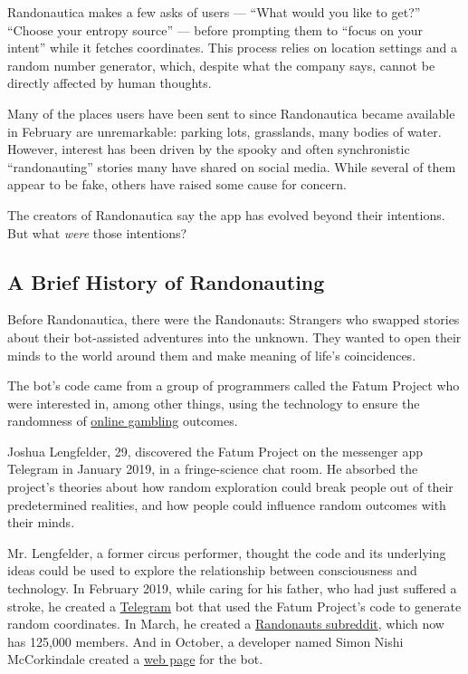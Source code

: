 Randonautica makes a few asks of users --- ``What would you like to
get?'' ``Choose your entropy source'' --- before prompting them to
``focus on your intent'' while it fetches coordinates. This process
relies on location settings and a random number generator, which,
despite what the company says, cannot be directly affected by human
thoughts.

Many of the places users have been sent to since Randonautica became
available in February are unremarkable: parking lots, grasslands, many
bodies of water. However, interest has been driven by the spooky and
often synchronistic ``randonauting'' stories many have shared on social
media. While several of them appear to be fake, others have raised some
cause for concern.

The creators of Randonautica say the app has evolved beyond their
intentions. But what \emph{were} those intentions?

\hypertarget{a-brief-history-of-randonauting}{%
\subsection{A Brief History of
Randonauting}\label{a-brief-history-of-randonauting}}

Before Randonautica, there were the Randonauts: Strangers who swapped
stories about their bot-assisted adventures into the unknown. They
wanted to open their minds to the world around them and make meaning of
life's coincidences.

The bot's code came from a group of programmers called the Fatum Project
who were interested in, among other things, using the technology to
ensure the randomness of
\href{https://medium.com/@fatum_project/introducing-fatum-ab676e3c83d}{online
gambling} outcomes.

Joshua Lengfelder, 29, discovered the Fatum Project on the messenger app
Telegram in January 2019, in a fringe-science chat room. He absorbed the
project's theories about how random exploration could break people out
of their predetermined realities, and how people could influence random
outcomes with their minds.

Mr. Lengfelder, a former circus performer, thought the code and its
underlying ideas could be used to explore the relationship between
consciousness and technology. In February 2019, while caring for his
father, who had just suffered a stroke, he created a
\href{http://t.me/randonauts}{Telegram} bot that used the Fatum
Project's code to generate random coordinates. In March, he created a
\href{http://reddit.com/r/randonauts}{Randonauts subreddit}, which now
has 125,000 members. And in October, a developer named Simon Nishi
McCorkindale created a \href{https://bot.randonauts.com/}{web page} for
the bot.

